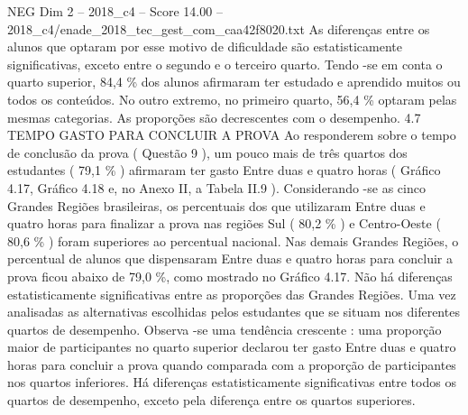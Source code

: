\begin{textsample}{NEG Dim 2 – 2018\_c4 – Score 14.00 – 2018\_c4/enade\_2018\_tec\_gest\_com\_caa42f8020.txt}
As diferenças entre os alunos que optaram por esse motivo de dificuldade são estatisticamente significativas, exceto entre o segundo e o terceiro quarto.
Tendo -se em conta o quarto superior, 84,4 \% dos alunos afirmaram ter estudado e aprendido muitos ou todos os conteúdos.
No outro extremo, no primeiro quarto, 56,4 \% optaram pelas mesmas categorias.
As proporções são decrescentes com o desempenho. 4.7 TEMPO GASTO PARA CONCLUIR A PROVA Ao responderem sobre o tempo de conclusão da prova ( Questão 9 ), um pouco mais de três quartos dos estudantes ( 79,1 \% ) afirmaram ter gasto Entre duas e quatro horas ( Gráfico 4.17, Gráfico 4.18 e, no Anexo II, a Tabela II.9 ).
Considerando -se as cinco Grandes Regiões brasileiras, os percentuais dos que utilizaram Entre duas e quatro horas para finalizar a prova nas regiões Sul ( 80,2 \% ) e Centro-Oeste ( 80,6 \% ) foram superiores ao percentual nacional.
Nas demais Grandes Regiões, o percentual de alunos que dispensaram Entre duas e quatro horas para concluir a prova ficou abaixo de 79,0 \%, como mostrado no Gráfico 4.17.
Não há diferenças estatisticamente significativas entre as proporções das Grandes Regiões.
Uma vez analisadas as alternativas escolhidas pelos estudantes que se situam nos diferentes quartos de desempenho.
Observa -se uma tendência crescente : uma proporção maior de participantes no quarto superior declarou ter gasto Entre duas e quatro horas para concluir a prova quando comparada com a proporção de participantes nos quartos inferiores.
Há diferenças estatisticamente significativas entre todos os quartos de desempenho, exceto pela diferença entre os quartos superiores.

\end{textsample}
